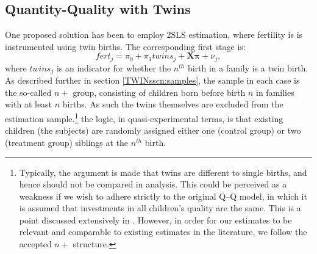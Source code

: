 \subsection{Quantity-Quality with Twins}           \label{TWINsscn:methodQQ}
One proposed solution has been to employ 2SLS estimation, where fertility is 
is instrumented using twin births. The corresponding first stage is:
\begin{equation}
\label{TWINeqn:firststage}
fert_{j}=\pi_0+\pi_1 twins_{j}+\bm{X}\bm{\pi}+\nu_{j},
\end{equation}
where $twins_j$ is an indicator for whether the $n^{th}$ birth in a family is a 
twin birth. As described further in section \ref{TWINsscn:samples}, the sample 
in each case is the so-called $n+$ group, consisting of children born before 
birth $n$ in families with at least $n$ births. As such the twins themselves are 
excluded from the estimation sample.\footnote{Typically, the argument is made 
that twins are different to single births, and hence should not be compared in 
analysis.  This could be perceived as a weakness if we wish to adhere strictly 
to the original Q--Q model, in which it is assumed that investments in all 
children's quality are the same.  This is a point discussed extensively in 
\citet{RosenzweigZhang2009}. However, in order for our estimates to be relevant 
and comparable to existing estimates in the literature, we follow the accepted
$n+$ structure.} the logic, in quasi-experimental terms, is that existing 
children (the subjects) are randomly assigned either one (control group) or two 
(treatment group) siblings at the $n^{th}$ birth.

